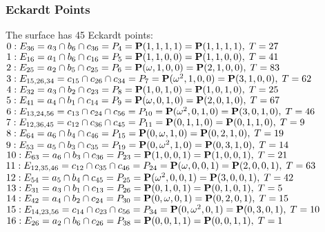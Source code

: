 \documentclass{article}
\newcommand{\bP}{{\bf P}}
\begin{document}
{\subsubsection*{Eckardt Points}
The surface has 45 Eckardt points:\\
$0 : E_{36}=a_{3} \cap b_{6} \cap c_{36} = P_{4}=\bP(1, 1, 1, 1) = \bP(1, 1, 1, 1),\; T= 27$\\
$1 : E_{16}=a_{1} \cap b_{6} \cap c_{16} = P_{5}=\bP(1, 1, 0, 0) = \bP(1, 1, 0, 0),\; T= 41$\\
$2 : E_{25}=a_{2} \cap b_{5} \cap c_{25} = P_{6}=\bP(\omega , 1, 0, 0) = \bP(2, 1, 0, 0),\; T= 83$\\
$3 : E_{15,26,34}=c_{15} \cap c_{26} \cap c_{34} = P_{7}=\bP(\omega^{2}, 1, 0, 0) = \bP(3, 1, 0, 0),\; T= 62$\\
$4 : E_{32}=a_{3} \cap b_{2} \cap c_{23} = P_{8}=\bP(1, 0, 1, 0) = \bP(1, 0, 1, 0),\; T= 25$\\
$5 : E_{41}=a_{4} \cap b_{1} \cap c_{14} = P_{9}=\bP(\omega , 0, 1, 0) = \bP(2, 0, 1, 0),\; T= 67$\\
$6 : E_{13,24,56}=c_{13} \cap c_{24} \cap c_{56} = P_{10}=\bP(\omega^{2}, 0, 1, 0) = \bP(3, 0, 1, 0),\; T= 46$\\
$7 : E_{12,36,45}=c_{12} \cap c_{36} \cap c_{45} = P_{11}=\bP(0, 1, 1, 0) = \bP(0, 1, 1, 0),\; T= 9$\\
$8 : E_{64}=a_{6} \cap b_{4} \cap c_{46} = P_{15}=\bP(0, \omega , 1, 0) = \bP(0, 2, 1, 0),\; T= 19$\\
$9 : E_{53}=a_{5} \cap b_{3} \cap c_{35} = P_{19}=\bP(0, \omega^{2}, 1, 0) = \bP(0, 3, 1, 0),\; T= 14$\\
$10 : E_{63}=a_{6} \cap b_{3} \cap c_{36} = P_{23}=\bP(1, 0, 0, 1) = \bP(1, 0, 0, 1),\; T= 21$\\
$11 : E_{12,35,46}=c_{12} \cap c_{35} \cap c_{46} = P_{24}=\bP(\omega , 0, 0, 1) = \bP(2, 0, 0, 1),\; T= 63$\\
$12 : E_{54}=a_{5} \cap b_{4} \cap c_{45} = P_{25}=\bP(\omega^{2}, 0, 0, 1) = \bP(3, 0, 0, 1),\; T= 42$\\
$13 : E_{31}=a_{3} \cap b_{1} \cap c_{13} = P_{26}=\bP(0, 1, 0, 1) = \bP(0, 1, 0, 1),\; T= 5$\\
$14 : E_{42}=a_{4} \cap b_{2} \cap c_{24} = P_{30}=\bP(0, \omega , 0, 1) = \bP(0, 2, 0, 1),\; T= 15$\\
$15 : E_{14,23,56}=c_{14} \cap c_{23} \cap c_{56} = P_{34}=\bP(0, \omega^{2}, 0, 1) = \bP(0, 3, 0, 1),\; T= 10$\\
$16 : E_{26}=a_{2} \cap b_{6} \cap c_{26} = P_{38}=\bP(0, 0, 1, 1) = \bP(0, 0, 1, 1),\; T= 1$\\
}
\end{document}
